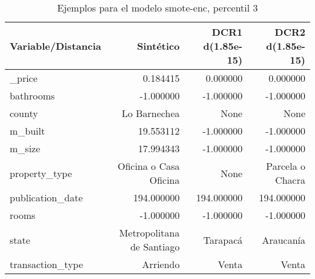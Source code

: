 \begin{table}[H]
\centering
\fontsize{10}{14}\selectfont
\caption{Ejemplos para el modelo smote-enc, percentil 3}
\label{table-example-economicos-b-1-smote-enc-3p}
\begin{tabular}{|l|r|r|r|}
\hline
\rowcolor[gray]{0.8}
Variable/Distancia & Sintético & DCR1 d(1.85e-15) & DCR2 d(1.85e-15) \\
\hline \_price & \cellcolor[rgb]{0.9, 0.54, 0.52} 0.184415 & \cellcolor[rgb]{0.9, 0.54, 0.52} 0.000000 & \cellcolor[rgb]{0.9, 0.54, 0.52} 0.000000 \\
\hline bathrooms & \cellcolor[rgb]{0.9, 0.54, 0.52} -1.000000 & \cellcolor[rgb]{0.9, 0.54, 0.52} -1.000000 & \cellcolor[rgb]{0.9, 0.54, 0.52} -1.000000 \\
\hline county & \cellcolor[rgb]{0.9, 0.54, 0.52} Lo Barnechea & None & None \\
\hline m\_built & \cellcolor[rgb]{0.9, 0.54, 0.52} 19.553112 & -1.000000 & -1.000000 \\
\hline m\_size & \cellcolor[rgb]{0.9, 0.54, 0.52} 17.994343 & -1.000000 & -1.000000 \\
\hline property\_type & \cellcolor[rgb]{0.9, 0.54, 0.52} Oficina o Casa Oficina & None & Parcela o Chacra \\
\hline publication\_date & \cellcolor[rgb]{0.9, 0.54, 0.52} 194.000000 & \cellcolor[rgb]{0.9, 0.54, 0.52} 194.000000 & \cellcolor[rgb]{0.9, 0.54, 0.52} 194.000000 \\
\hline rooms & \cellcolor[rgb]{0.9, 0.54, 0.52} -1.000000 & \cellcolor[rgb]{0.9, 0.54, 0.52} -1.000000 & \cellcolor[rgb]{0.9, 0.54, 0.52} -1.000000 \\
\hline state & \cellcolor[rgb]{0.9, 0.54, 0.52} Metropolitana de Santiago & Tarapacá & Araucanía \\
\hline transaction\_type & \cellcolor[rgb]{0.9, 0.54, 0.52} Arriendo & Venta & Venta \\
\hline
\end{tabular}
\end{table}
